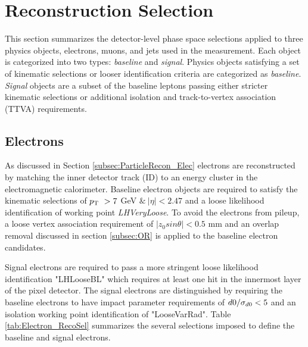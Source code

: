 \section{Reconstruction Selection}
\label{sec:ObjReconstruction}

This section summarizes the detector-level phase space selections applied to three physics objects, electrons, muons, and jets used in the measurement. Each object is categorized into two types: \textit{baseline} and \textit{signal}. Physics objects satisfying a set of kinematic selections or looser identification criteria are categorized as \textit{baseline}. \textit{Signal} objects are a subset of the baseline leptons passing either stricter kinematic selections or additional isolation and track-to-vertex association (TTVA) requirements. 

\subsection{Electrons}
\label{subsec:ElecRecon}

As discussed in Section \ref{subsec:ParticleRecon_Elec} electrons are reconstructed by matching the inner detector track (ID) to an energy cluster in the electromagnetic calorimeter. Baseline electron objects are required to satisfy the kinematic selections of $p_{\textrm{T} ~} > 7$ GeV $ \&~ |\eta| < 2.47$ and a loose likelihood identification of working point \textit{LHVeryLoose}. To avoid the electrons from pileup, a loose vertex association requirement of $|z_{0}sin\theta| < 0.5 $ mm and an overlap removal discussed in section \ref{subsec:OR} is applied to the baseline electron candidates.

Signal electrons are required to pass a more stringent loose likelihood identification "LHLooseBL" which requires at least one hit in the innermost layer of the pixel detector. The signal electrons are distinguished by requiring the baseline electrons to have impact parameter requirements of $d0/ \sigma_{d0} < 5$ and an isolation working point identification of "LooseVarRad". Table \ref{tab:Electron_RecoSel} summarizes the several selections imposed to define the baseline and signal electrons.

